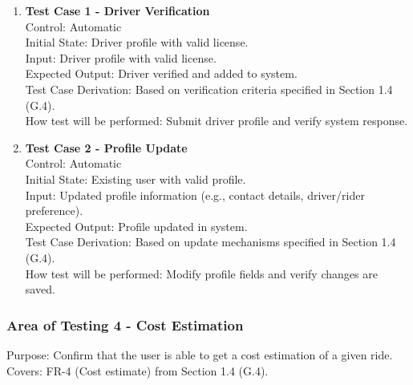 \documentclass[12pt, titlepage]{article}
\begin{document}
\begin{enumerate}
\item \textbf{Test Case 1 - Driver Verification}\\
Control: Automatic\\
Initial State: Driver profile with valid license.\\
Input: Driver profile with valid license.\\
Expected Output: Driver verified and added to system.\\
Test Case Derivation: Based on verification criteria specified in Section 1.4 (G.4).\\
How test will be performed: Submit driver profile and verify system response.\\[5pt]

\item \textbf{Test Case 2 - Profile Update}\\
Control: Automatic\\
Initial State: Existing user with valid profile.\\
Input: Updated profile information (e.g., contact details, driver/rider preference).\\
Expected Output: Profile updated in system.\\
Test Case Derivation: Based on update mechanisms specified in Section 1.4 (G.4).\\
How test will be performed: Modify profile fields and verify changes are saved.\\
\end{enumerate}

\subsubsection{Area of Testing 4 - Cost Estimation}

Purpose: Confirm that the user is able to get a cost estimation of a given ride.  
Covers: FR-4 (Cost estimate) from Section 1.4 (G.4).
\end{document}
